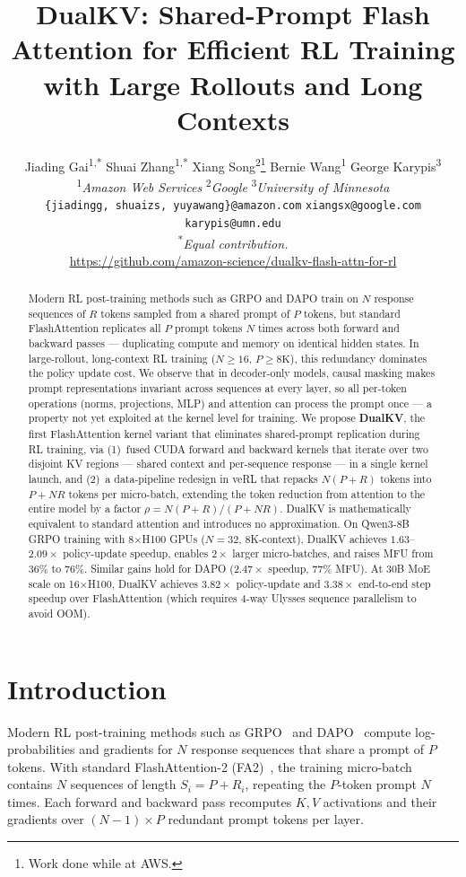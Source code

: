 \documentclass{article}
\title{DualKV: Shared-Prompt Flash Attention for Efficient RL Training with Large Rollouts and Long Contexts}
\author{
  Jiading Gai\textsuperscript{1,*} \quad
  Shuai Zhang\textsuperscript{1,*} \quad
  Xiang Song\textsuperscript{2}\thanks{Work done while at AWS.} \quad
  Bernie Wang\textsuperscript{1} \quad
  George Karypis\textsuperscript{3}\footnotemark[2]
  \\[4pt] 
  \textsuperscript{1}\textit{Amazon Web Services} \quad
  \textsuperscript{2}\textit{Google} \quad
\textsuperscript{3}\textit{University of Minnesota} \\
  \texttt{\{jiadingg, shuaizs, yuyawang\}@amazon.com} \quad \texttt{xiangsx@google.com} \quad \texttt{karypis@umn.edu} \\[2pt]
  \textsuperscript{*}\textit{Equal contribution.} \\[2pt]
  \textcolor{blue}{\url{https://github.com/amazon-science/dualkv-flash-attn-for-rl}}
}
\begin{document}
\maketitle

\begin{abstract}
Modern RL post-training methods such as GRPO and DAPO train on $N$ response sequences of $R$ tokens sampled from a shared prompt of $P$ tokens, but standard FlashAttention replicates all $P$ prompt tokens $N$ times across both forward and backward passes --- duplicating compute and memory on identical hidden states.
In large-rollout, long-context RL training ($N{\geq}16$, $P{\geq}8\text{K}$), this redundancy dominates the policy update cost.
We observe that in decoder-only models, causal masking makes prompt representations invariant across sequences at every layer, so all per-token operations (norms, projections, MLP) and attention can process the prompt once --- a property not yet exploited at the kernel level for training.
We propose \textbf{DualKV}, the first FlashAttention kernel variant that eliminates shared-prompt replication during RL training, via (1)~fused CUDA forward and backward kernels that iterate over two disjoint KV regions --- shared context and per-sequence response --- in a single kernel launch, and (2)~a data-pipeline redesign in veRL that repacks $N(P{+}R)$ tokens into $P{+}NR$ tokens per micro-batch, extending the token reduction from attention to the entire model by a factor $\rho = N(P{+}R)/(P{+}NR)$.
DualKV is mathematically equivalent to standard attention and introduces no approximation.
On Qwen3-8B GRPO training with 8$\times$H100 GPUs ($N{=}32$, 8K-context), DualKV achieves $1.63$--$2.09\times$ policy-update speedup, enables $2\times$ larger micro-batches, and raises MFU from $36\%$ to $76\%$. Similar gains hold for DAPO ($2.47\times$ speedup, $77\%$ MFU). At 30B MoE scale on 16$\times$H100, DualKV achieves $3.82\times$ policy-update and $3.38\times$ end-to-end step speedup over FlashAttention (which requires 4-way Ulysses sequence parallelism to avoid OOM).
\end{abstract}

\section{Introduction}
\label{sec:intro}

Modern RL post-training methods such as GRPO~\citep{shao2024deepseekmath} and DAPO~\citep{yu2025dapo} compute log-probabilities and gradients for $N$ response sequences that share a prompt of $P$ tokens. With standard FlashAttention-2 (FA2)~\citep{dao2023flashattention2}, the training micro-batch contains $N$ sequences of length $S_i = P + R_i$, repeating the $P$-token prompt $N$ times. Each forward and backward pass recomputes $K, V$ activations and their gradients over $(N{-}1) \times P$ redundant prompt tokens per layer.
\end{document}
